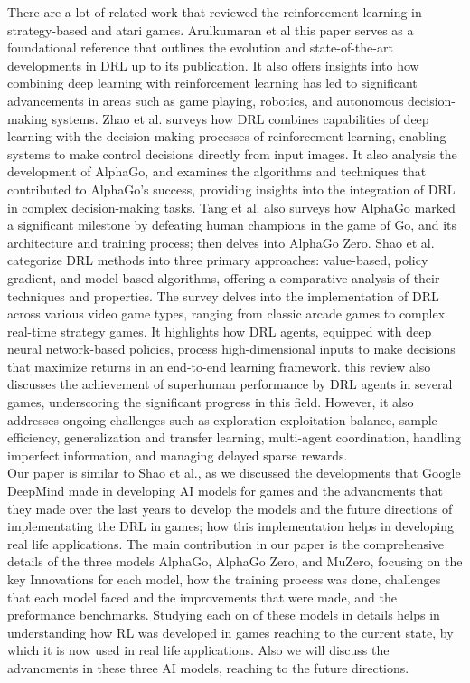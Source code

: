 There are a lot of related work that reviewed the
reinforcement learning in strategy-based and atari games. Arulkumaran et
al\cite{I9} this paper serves as a foundational reference that outlines 
the evolution and state-of-the-art developments in DRL up to its 
publication. It also offers insights into how combining deep learning 
with reinforcement learning has led to significant advancements in 
areas such as game playing, robotics, and autonomous decision-making 
systems. Zhao et al.\cite{I10} surveys how DRL combines 
capabilities of deep learning with the decision-making processes of 
reinforcement learning, enabling systems to make control decisions 
directly from input images. It also analysis the development of 
AlphaGo, and examines the algorithms and techniques that contributed 
to AlphaGo's success, providing insights into the integration of DRL 
in complex decision-making tasks. Tang et
al.\cite{I11} also surveys how AlphaGo marked a significant 
milestone by defeating human champions in the game of Go, and its 
architecture and training process; then delves into AlphaGo Zero. 
Shao et al.\cite{I12} categorize DRL methods into three primary 
approaches: value-based, policy gradient, and model-based algorithms, 
offering a comparative analysis of their techniques and properties.
The survey delves into the implementation of DRL across various video 
game types, ranging from classic arcade games to complex real-time 
strategy games.
It highlights how DRL agents, equipped with deep neural network-based 
policies, process high-dimensional inputs to make decisions that 
maximize returns in an end-to-end learning framework.
this review also discusses the achievement of superhuman performance 
by DRL agents in several games, underscoring the significant progress 
in this field.
However, it also addresses ongoing challenges such as exploration-exploitation 
balance, sample efficiency, generalization and transfer learning, 
multi-agent coordination, handling imperfect information, and managing 
delayed sparse rewards.\\
Our paper is similar to Shao et al.\cite{I12}, as we discussed the 
developments that Google DeepMind made in developing AI models for 
games and the advancments that they made over the last years to develop 
the models and the future directions of implementating the DRL in games; 
how this implementation helps in developing real life applications. The
main contribution in our paper is the comprehensive details of the three 
models AlphaGo, AlphaGo Zero, and MuZero, focusing on the key Innovations for 
each model, how the training process was done, challenges that each model
faced and the improvements that were made, and the preformance benchmarks. 
Studying each on of these models in details helps in understanding how 
RL was developed in games reaching to the current state, by which it is 
now used in real life applications.
Also we will discuss the advancments in these three AI models, 
reaching to the future directions.